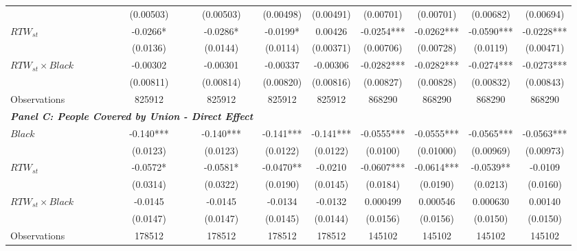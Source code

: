\begin{table}[ht!]
\begin{tabular}{l*{8}{c}}
&   (0.00503)   &   (0.00503)   &   (0.00498)   &   (0.00491)   &   (0.00701)   &   (0.00701)   &   (0.00682)   &   (0.00694)   \\
[1em]
$ RTW_{st} $      &     -0.0266*  &     -0.0286*  &     -0.0199*  &     0.00426   &     -0.0254***&     -0.0262***&     -0.0590***&     -0.0228***\\
&    (0.0136)   &    (0.0144)   &    (0.0114)   &   (0.00371)   &   (0.00706)   &   (0.00728)   &    (0.0119)   &   (0.00471)   \\
[1em]
$ RTW_{st} \times Black $&    -0.00302   &    -0.00301   &    -0.00337   &    -0.00306   &     -0.0282***&     -0.0282***&     -0.0274***&     -0.0273***\\
&   (0.00811)   &   (0.00814)   &   (0.00820)   &   (0.00816)   &   (0.00827)   &   (0.00828)   &   (0.00832)   &   (0.00843)   \\
\hline
Observations        &      825912   &      825912   &      825912   &      825912   &      868290   &      868290   &      868290   &      868290   \\
\hline
\multicolumn{3}{l}{\linebreak \textbf{\textit{Panel C: People Covered by Union - Direct Effect}}} \\
$ Black $           &      -0.140***&      -0.140***&      -0.141***&      -0.141***&     -0.0555***&     -0.0555***&     -0.0565***&     -0.0563***\\
&    (0.0123)   &    (0.0123)   &    (0.0122)   &    (0.0122)   &    (0.0100)   &   (0.01000)   &   (0.00969)   &   (0.00973)   \\
[1em]
$ RTW_{st} $      &     -0.0572*  &     -0.0581*  &     -0.0470** &     -0.0210   &     -0.0607***&     -0.0614***&     -0.0539** &     -0.0109   \\
&    (0.0314)   &    (0.0322)   &    (0.0190)   &    (0.0145)   &    (0.0184)   &    (0.0190)   &    (0.0213)   &    (0.0160)   \\
[1em]
$ RTW_{st} \times Black $&     -0.0145   &     -0.0145   &     -0.0134   &     -0.0132   &    0.000499   &    0.000546   &    0.000630   &     0.00140   \\
&    (0.0147)   &    (0.0147)   &    (0.0145)   &    (0.0144)   &    (0.0156)   &    (0.0156)   &    (0.0150)   &    (0.0150)   \\
\hline
Observations        &      178512   &      178512   &      178512   &      178512   &      145102   &      145102   &      145102   &      145102   \\
\hline

\end{tabular}
\end{table}
